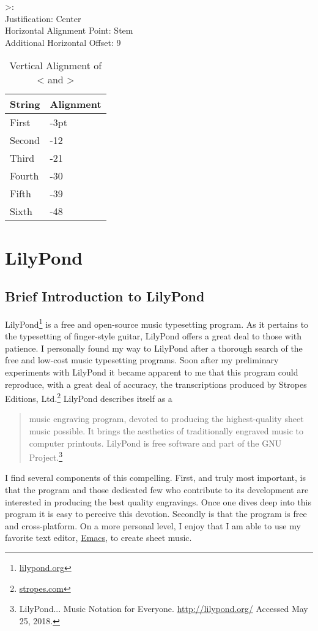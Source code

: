 \documentclass[]{memoir}
\begin{document}
>:\\
\indent Justification: Center\\
\indent Horizontal Alignment Point: Stem\\
\indent Additional Horizontal Offset: 9\\

\begin{table}[h!]
  \centering
  \begin{tabular}{l l}
    String & Alignment\\\hline
    First & -3pt\\
    Second & -12\\
    Third & -21\\
    Fourth & -30\\
    Fifth & -39\\
    Sixth & -48\\
  \end{tabular}
  \caption{Vertical Alignment of < and >}
\end{table}

\part{LilyPond}
\label{part:lilypond}

\chapter{Brief Introduction to LilyPond}
\label{cha:brief-intr-lilyp}

LilyPond\footnote{\url{lilypond.org}} is a free and open-source music
typesetting program. As it pertains to the typesetting of finger-style
guitar, LilyPond offers a great deal to those with patience. I
personally found my way to LilyPond after a thorough search of the
free and low-cost music typesetting programs. Soon after my
preliminary experiments with LilyPond it became apparent to me that
this program could reproduce, with a great deal of accuracy, the
transcriptions produced by Stropes Editions,
Ltd.\footnote{\url{stropes.com}} LilyPond describes itself as a
\begin{quotation}
  \noindent music engraving program, devoted to producing the
  highest-quality sheet music possible.  It brings the aesthetics of
  traditionally engraved music to computer printouts. LilyPond is free
  software and part of the GNU Project.\footnote{LilyPond... Music
    Notation for Everyone. \url{http://lilypond.org/} Accessed May 25,
    2018.}
\end{quotation}
I find several components of this compelling. First, and truly most
important, is that the program and those dedicated few who contribute
to its development are interested in producing the best quality
engravings. Once one dives deep into this program it is easy to
perceive this devotion. Secondly is that the program is free and
cross-platform. On a more personal level, I enjoy that I am able to
use my favorite text editor,
\href{https://www.gnu.org/software/emacs/}{Emacs}, to create sheet
music.
\end{document}
